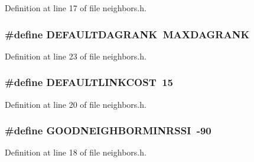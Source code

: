 Definition at line 17 of file neighbors.\+h.

\subsubsection[{\texorpdfstring{D\+E\+F\+A\+U\+L\+T\+D\+A\+G\+R\+A\+NK}{DEFAULTDAGRANK}}]{\setlength{\rightskip}{0pt plus 5cm}\#define D\+E\+F\+A\+U\+L\+T\+D\+A\+G\+R\+A\+NK~{\bf M\+A\+X\+D\+A\+G\+R\+A\+NK}}\hypertarget{group___neighbors_gacc9a3232f2dca59348d8b536005a2f89}{}\label{group___neighbors_gacc9a3232f2dca59348d8b536005a2f89}


Definition at line 23 of file neighbors.\+h.

\subsubsection[{\texorpdfstring{D\+E\+F\+A\+U\+L\+T\+L\+I\+N\+K\+C\+O\+ST}{DEFAULTLINKCOST}}]{\setlength{\rightskip}{0pt plus 5cm}\#define D\+E\+F\+A\+U\+L\+T\+L\+I\+N\+K\+C\+O\+ST~15}\hypertarget{group___neighbors_ga4d2874b0e44346069a08e6cf15d85d87}{}\label{group___neighbors_ga4d2874b0e44346069a08e6cf15d85d87}


Definition at line 20 of file neighbors.\+h.

\subsubsection[{\texorpdfstring{G\+O\+O\+D\+N\+E\+I\+G\+H\+B\+O\+R\+M\+I\+N\+R\+S\+SI}{GOODNEIGHBORMINRSSI}}]{\setlength{\rightskip}{0pt plus 5cm}\#define G\+O\+O\+D\+N\+E\+I\+G\+H\+B\+O\+R\+M\+I\+N\+R\+S\+SI~-\/90}\hypertarget{group___neighbors_ga6e36748acedcb5b5ca037ad19227aeec}{}\label{group___neighbors_ga6e36748acedcb5b5ca037ad19227aeec}


Definition at line 18 of file neighbors.\+h.

